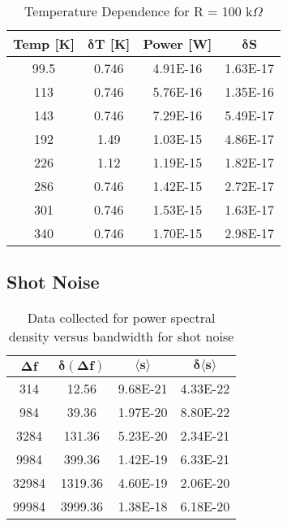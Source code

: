 \begin{table}[H]
	\centering
	\begin{tabular}{cccc} \toprule
		\textbf{Temp [K]} & $\mathbf{\delta}$\textbf{T [K]} & \textbf{Power [W]} & $\mathbf{\delta}$\textbf{S} \\ \toprule
		99.5 & 0.746 & 4.91E-16 & 1.63E-17 \\
		113  & 0.746 & 5.76E-16 & 1.35E-16 \\
		143  & 0.746 & 7.29E-16 & 5.49E-17 \\
		192  & 1.49  & 1.03E-15 & 4.86E-17 \\
		226  & 1.12  & 1.19E-15 & 1.82E-17 \\
		286  & 0.746 & 1.42E-15 & 2.72E-17 \\
		301  & 0.746 & 1.53E-15 & 1.63E-17 \\
		340  & 0.746 & 1.70E-15 & 2.98E-17 \\
		\bottomrule
	\end{tabular}
	\caption{Temperature Dependence for R = 100 k$\Omega$}
	\label{temp100k}
\end{table}


\subsection*{Shot Noise}

\begin{table}[H]
	\centering
	\begin{tabular}{cccc} \toprule
		$\mathbf{\Delta f}$ & $\mathbf{\delta (\Delta f)}$ & $\mathbf{\langle s \rangle}$ & $\mathbf{\delta \langle s \rangle}$ \\ \toprule
		314   & 12.56   & 9.68E-21 & 4.33E-22 \\
		984   & 39.36   & 1.97E-20 & 8.80E-22 \\
		3284  & 131.36  & 5.23E-20 & 2.34E-21 \\
		9984  & 399.36  & 1.42E-19 & 6.33E-21 \\
		32984 & 1319.36 & 4.60E-19 & 2.06E-20 \\
		99984 & 3999.36 & 1.38E-18 & 6.18E-20 \\
		\bottomrule
	\end{tabular}
	\caption{Data collected for power spectral density versus bandwidth for shot noise}
	\label{shotBandwidthTable}
\end{table}



